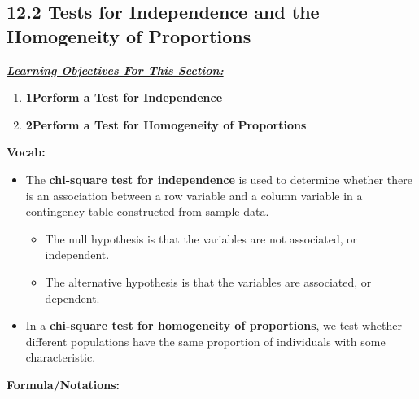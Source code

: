 \documentclass{report}
\begin{document}
    \pagebreak \bigbreak \noindent 
    \subsection*{12.2 Tests for Independence and the Homogeneity of Proportions}
    \bigbreak \noindent 
    \bigbreak \noindent 
    \textbf{\textit{\underline{Learning Objectives For This Section:}}}
    \begin{enumerate}
        \item \textbf{1Perform a Test for Independence}
        \item \textbf{2Perform a Test for Homogeneity of Proportions}
    \end{enumerate}
    \bigbreak \noindent 
    \textbf{Vocab:}
    \begin{itemize}
        \item The \textbf{chi-square test for independence} is used to determine whether there is an association between a row variable and a column variable in a contingency table constructed from sample data.
            \begin{itemize}
                \item The null hypothesis is that the variables are not associated, or independent.
                \item The alternative hypothesis is that the variables are associated, or dependent.

            \end{itemize}
        \item In a \textbf{chi-square test for homogeneity of proportions}, we test whether different populations have the same proportion of individuals with some characteristic.
    \end{itemize}
    \bigbreak \noindent \bigbreak \noindent 
    \textbf{Formula/Notations:}
\end{document}
